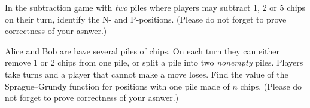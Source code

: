 \documentclass[addpoints]{exam}
\begin{document}
  \pagestyle{headandfoot}
  \runningheadrule

  \firstpagefooter{}{}{}
  \runningfooter{}{}{}
  \begin{flushright}

    \vspace{0.2in}
  \end{flushright}

  \begin{questions}
    \question[10]
      In the subtraction game with \emph{two} piles where players may subtract 1, 2 or
			5 chips on their turn, identify the N- and P-positions.
			(Please do not forget to prove correctness of your asnwer.)

      \begin{solution}[\stretch{1}]
      \end{solution}
      \newpage
    \question[10]
      Alice and Bob are have several piles of chips. On each turn they can either
			remove $1$ or $2$ chips from one pile, or split a pile into two \emph{nonempty}
			piles. Players take turns and a player that cannot make a move loses. Find the
			value of the Sprague--Grundy function for positions with one pile made of $n$
			chips.
			(Please do not forget to prove correctness of your asnwer.)

      \begin{solution}[\stretch{1}]
      \end{solution}
      \newpage
  \end{questions}
\end{document}
